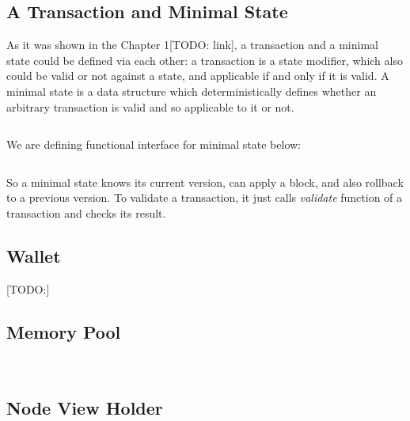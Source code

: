 \documentclass[]{report}   %
\begin{document}
\subsection{A Transaction and Minimal State}

As it was shown in the Chapter 1[TODO: link], a transaction and a minimal state could be defined via each other: a transaction is a state modifier, which also could be valid or not against a state, and applicable if and only if it is valid. A minimal state is a data structure which deterministically defines whether an arbitrary transaction is valid and so applicable to it or not. 

\begin{lstlisting}
\end{lstlisting}

We are defining functional interface for minimal state below:

\begin{lstlisting}
\end{lstlisting}

So a minimal state knows its current version, can apply a block, and also rollback to a previous version. To validate a transaction, it just calls \textit{validate} function of a transaction and checks its result.

\subsection{Wallet}

[TODO:]

\subsection{Memory Pool}

\begin{lstlisting}


\end{lstlisting}

\subsection{}

\subsection{Node View Holder}


\begin{lstlisting}

\end{lstlisting}
\end{document}
